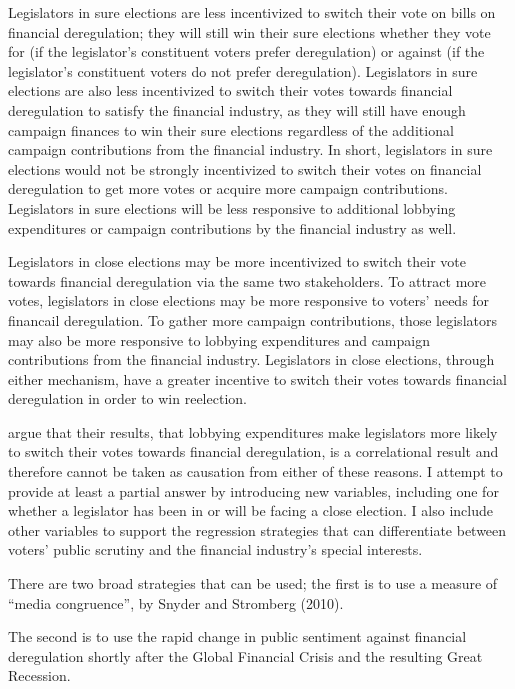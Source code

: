 \documentclass[ProjectKWK]{subfiles}
\begin{document}
Legislators in sure elections are less incentivized to switch their vote on bills on financial deregulation; they will still win their sure elections whether they vote for (if the legislator's constituent voters prefer deregulation) or against (if the legislator's constituent voters do not prefer deregulation). Legislators in sure elections are also less incentivized to switch their votes towards financial deregulation to satisfy the financial industry, as they will still have enough campaign finances to win their sure elections regardless of the additional campaign contributions from the financial industry. In short, legislators in sure elections would not be strongly incentivized to switch their votes on financial deregulation to get more votes or acquire more campaign contributions. Legislators in sure elections will be less responsive to additional lobbying expenditures or campaign contributions by the financial industry as well.

Legislators in close elections may be more incentivized to switch their vote towards financial deregulation via the same two stakeholders. To attract more votes, legislators in close elections may be more responsive to voters' needs for financail deregulation. To gather more campaign contributions, those legislators may also be more responsive to lobbying expenditures and campaign contributions from the financial industry. Legislators in close elections, through either mechanism, have a greater incentive to switch their votes towards financial deregulation in order to win reelection.

\cite{IM14} argue that their results, that lobbying expenditures make legislators more likely to switch their votes towards financial deregulation, is a correlational result and therefore cannot be taken as causation from either of these reasons. I attempt to provide at least a partial answer by introducing new variables, including one for whether a legislator has been in or will be facing a close election. I also include other variables to support the regression strategies that can differentiate between voters' public scrutiny and the financial industry's special interests.

There are two broad strategies that can be used; the first is to use a measure of ``media congruence'', by Snyder and Stromberg (2010).

The second is to use the rapid change in public sentiment against financial deregulation shortly after the Global Financial Crisis and the resulting Great Recession.
\end{document}
